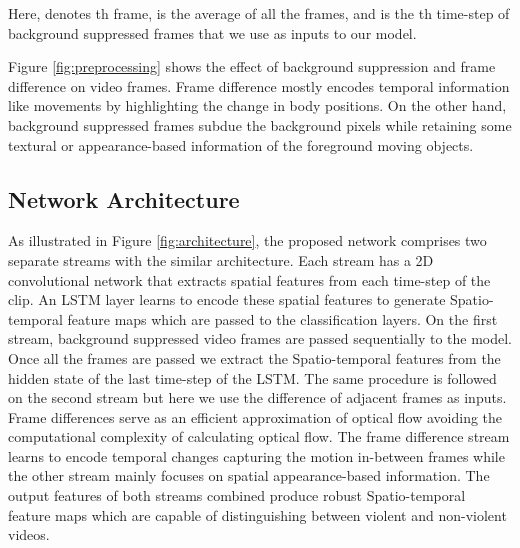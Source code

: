 \documentclass[conference]{IEEEtran}
\begin{document}
Here,  denotes th frame,  is the average of all the frames, and  is the th time-step of background suppressed frames that we use as inputs to our model. 

Figure \ref{fig:preprocessing} shows the effect of background suppression and frame difference on video frames. Frame difference mostly encodes temporal information like movements by highlighting the change in body positions. On the other hand, background suppressed frames subdue the background pixels while retaining some textural or appearance-based information of the foreground moving objects.




\subsection{Network Architecture}
As illustrated in Figure \ref{fig:architecture}, the proposed network comprises two separate streams with the similar architecture. Each stream has a 2D convolutional network that extracts spatial features from each time-step of the clip. An LSTM layer learns to encode these spatial features to generate Spatio-temporal feature maps which are passed to the classification layers. On the first stream, background suppressed video frames are passed sequentially to the model. Once all the frames are passed we extract the Spatio-temporal features from the hidden state of the last time-step of the LSTM. The same procedure is followed on the second stream but here we use the difference of adjacent frames as inputs. Frame differences serve as an efficient approximation of optical flow avoiding the computational complexity of calculating optical flow. The frame difference stream learns to encode temporal changes capturing the motion in-between frames while the other stream mainly focuses on spatial appearance-based information. The output features of both streams combined produce robust Spatio-temporal feature maps which are capable of distinguishing between violent and non-violent videos.
\end{document}
